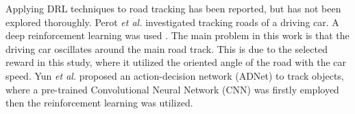\documentclass{svproc}
\begin{document}
	Applying DRL techniques to road tracking has been reported, but has not been explored thoroughly.  Perot \emph{et al.} investigated tracking roads of a driving car. A deep reinforcement learning was used 
	\cite{Perot2017End}. The main problem in this work is that the driving car oscillates around the main road track. This is due to the selected reward in this study, where it utilized the oriented angle of the road with the car speed. %
	Yun \textit{et al.} \cite{Yun2017Action,Yun2018Action} proposed an action-decision network (ADNet) to track objects, %
	where a pre-trained Convolutional Neural Network (CNN) was firstly employed then the reinforcement learning was utilized. 
\end{document}
